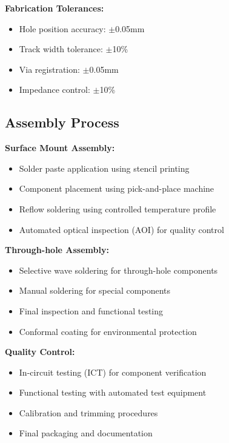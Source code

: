 \textbf{Fabrication Tolerances:}
\begin{itemize}
\item Hole position accuracy: $\pm$0.05mm
\item Track width tolerance: $\pm$10\%
\item Via registration: $\pm$0.05mm
\item Impedance control: $\pm$10\%
\end{itemize}

\subsection{Assembly Process}
\label{subsec:assembly_process}

\textbf{Surface Mount Assembly:}
\begin{itemize}
\item Solder paste application using stencil printing
\item Component placement using pick-and-place machine
\item Reflow soldering using controlled temperature profile
\item Automated optical inspection (AOI) for quality control
\end{itemize}

\textbf{Through-hole Assembly:}
\begin{itemize}
\item Selective wave soldering for through-hole components
\item Manual soldering for special components
\item Final inspection and functional testing
\item Conformal coating for environmental protection
\end{itemize}

\textbf{Quality Control:}
\begin{itemize}
\item In-circuit testing (ICT) for component verification
\item Functional testing with automated test equipment
\item Calibration and trimming procedures
\item Final packaging and documentation
\end{itemize}